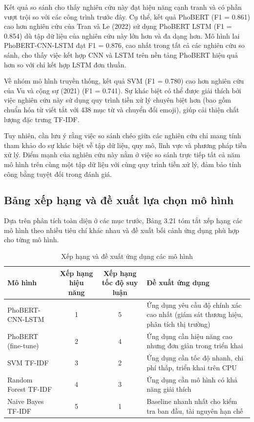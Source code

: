 \documentclass[14pt, a4paper]{report}
\begin{document}
Kết quả so sánh cho thấy nghiên cứu này đạt hiệu năng cạnh tranh và có phần vượt trội so với các công trình trước đây. Cụ thể, kết quả PhoBERT (F1 = 0.861) cao hơn nghiên cứu của Tran và Le (2022) sử dụng PhoBERT \+ LSTM (F1 = 0.854) dù tập dữ liệu của nghiên cứu này lớn hơn và đa dạng hơn. Mô hình lai PhoBERT-CNN-LSTM đạt F1 = 0.876, cao nhất trong tất cả các nghiên cứu so sánh, cho thấy việc kết hợp CNN và LSTM trên nền tảng PhoBERT hiệu quả hơn so với chỉ kết hợp LSTM đơn thuần.


Về nhóm mô hình truyền thống, kết quả SVM (F1 = 0.780) cao hơn nghiên cứu của Vu và cộng sự (2021) (F1 = 0.741). Sự khác biệt có thể được giải thích bởi việc nghiên cứu này sử dụng quy trình tiền xử lý chuyên biệt hơn (bao gồm chuẩn hóa từ viết tắt với 438 mục từ và chuyển đổi emoji), giúp cải thiện chất lượng đặc trưng TF-IDF.


Tuy nhiên, cần lưu ý rằng việc so sánh chéo giữa các nghiên cứu chỉ mang tính tham khảo do sự khác biệt về tập dữ liệu, quy mô, lĩnh vực và phương pháp tiền xử lý. Điểm mạnh của nghiên cứu này nằm ở việc so sánh trực tiếp tất cả năm mô hình trên cùng một tập dữ liệu với cùng quy trình tiền xử lý, đảm bảo tính công bằng tuyệt đối trong đánh giá.


\subsection{Bảng xếp hạng và đề xuất lựa chọn mô hình}


Dựa trên phân tích toàn diện ở các mục trước, Bảng 3.21 tóm tắt xếp hạng các mô hình theo nhiều tiêu chí khác nhau và đề xuất bối cảnh ứng dụng phù hợp cho từng mô hình.


\begin{table}[h]
\centering
\scriptsize
\caption{Xếp hạng và đề xuất ứng dụng các mô hình}
\begin{tabular}{|p{2.6cm}|c|c|p{6.8cm}|}
\hline
\textbf{Mô hình} & \textbf{Xếp hạng hiệu năng} & \textbf{Xếp hạng tốc độ suy luận} & \textbf{Đề xuất ứng dụng} \\
\hline
PhoBERT-CNN-LSTM & 1 & 5 & Ứng dụng yêu cầu độ chính xác cao nhất (giám sát thương hiệu, phân tích thị trường) \\
\hline
PhoBERT (fine-tune) & 2 & 4 & Ứng dụng cần hiệu năng cao nhưng đơn giản trong triển khai \\
\hline
SVM \+ TF-IDF & 3 & 2 & Ứng dụng cần tốc độ nhanh, chi phí thấp, triển khai trên CPU \\
\hline
Random Forest \+ TF-IDF & 4 & 3 & Ứng dụng cần mô hình có khả năng giải thích \\
\hline
Naive Bayes \+ TF-IDF & 5 & 1 & Baseline nhanh nhất cho kiểm tra ban đầu, tài nguyên hạn chế \\
\hline
\end{tabular}
\normalsize
\end{table}
\end{document}
